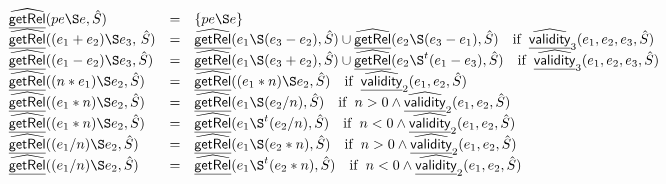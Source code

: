 \[\begin{array}{ll}
& \begin{array}{lll}
  \ahf{getRel}(pe \rel e, \hat{S}) &=& \{pe \rel e\}\\
  \ahf{getRel}((e_1 + e_2) \rel e_3, \, \hat{S})  &=& \ahf{getRel} (e_1 \rel (e_3 - e_2), \hat{S}) \cup \ahf{getRel} (e_2 \rel (e_3 - e_1), \hat{S}) \quad \ifc{\ahf{validity}_3(e_1, e_2, e_3, \hat{S})}\\
  \ahf{getRel}((e_1 - e_2) \rel e_3, \hat{S})  &=& \ahf{getRel} (e_1 \rel (e_3 + e_2), \hat{S}) \cup \ahf{getRel} (e_2 \rel^t (e_1 - e_3), \hat{S})\quad \ifc{\ahf{validity}_3(e_1, e_2, e_3, \hat{S})}\\
  \ahf{getRel} ((n * e_1) \rel e_2, \hat{S})  &=& \ahf{getRel} ((e_1  * n) \rel e_2, \hat{S}) \quad \ifc{\ahf{validity}_2(e_1, e_2, \hat{S})}\\
  \ahf{getRel} ((e_1  * n) \rel e_2, \hat{S}) &=& \ahf{getRel} (e_1 \rel (e_2/n), \hat{S}) \quad \ifc {n>0 \land \ahf{validity}_2(e_1, e_2, \hat{S})}\\
  \ahf{getRel} ((e_1  * n) \rel e_2, \hat{S}) &=& \ahf{getRel} (e_1 \rel^t (e_2/n), \hat{S}) \quad \ifc {n<0 \land \ahf{validity}_2(e_1, e_2, \hat{S})}\\
  \ahf{getRel} ((e_1  / n) \rel e_2, \hat{S}) &=& \ahf{getRel} (e_1 \rel (e_2*n), \hat{S}) \quad \ifc {n>0 \land \ahf{validity}_2(e_1, e_2, \hat{S})}\\
  \ahf{getRel} ((e_1  / n) \rel e_2, \hat{S}) &=& \ahf{getRel} (e_1 \rel^t (e_2*n), \hat{S}) \quad \ifc {n<0 \land \ahf{validity}_2(e_1, e_2, \hat{S})}\\
\end{array}\\

\end{array}\]
